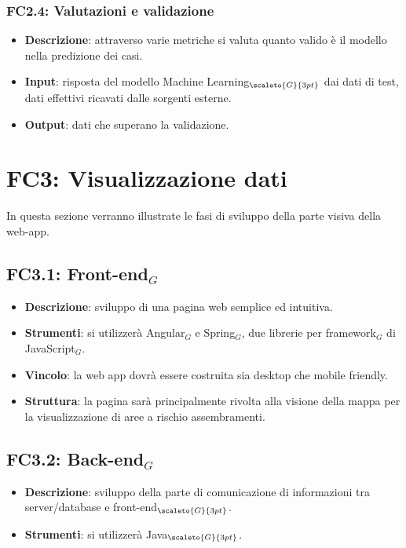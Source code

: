 \subsubsection{FC2.4: Valutazioni e validazione}\label{fasiProgettoElaborazioneDatiValutazioniValidazione}

\begin{itemize}
	\item \textbf{Descrizione}: attraverso varie metriche si valuta quanto valido è il modello nella predizione dei casi.
	\item \textbf{Input}: risposta del modello Machine Learning$_{\scaleto{G}{3pt}}$ dai dati di test, dati effettivi ricavati dalle sorgenti esterne.
	\item \textbf{Output}: dati che superano la validazione.
\end{itemize}

\section{FC3: Visualizzazione dati}\label{fasiProgettoVisualizzazioneDati}
In questa sezione verranno illustrate le fasi di sviluppo della parte visiva della web-app.

\subsection{FC3.1: Front-end$_G$}\label{fasiProgettoVisualizzazioneDatiFrontEnd}

\begin{itemize}
	\item \textbf{Descrizione}: sviluppo di una pagina web semplice ed intuitiva.
	\item \textbf{Strumenti}: si utilizzerà Angular$_G$ e Spring$_G$, due librerie per framework$_G$ di JavaScript$_G$.
	\item \textbf{Vincolo}: la web app dovrà essere costruita sia desktop che mobile friendly.
	\item \textbf{Struttura}: la pagina sarà principalmente rivolta alla visione della mappa per la visualizzazione di aree a rischio assembramenti.
\end{itemize}

\subsection{FC3.2: Back-end$_G$}\label{fasiProgettoVisualizzazioneDatiBackEnd}

\begin{itemize}
	\item \textbf{Descrizione}: sviluppo della parte di comunicazione di informazioni tra server/database e front-end$_{\scaleto{G}{3pt}}$.
	\item \textbf{Strumenti}: si utilizzerà Java$_{\scaleto{G}{3pt}}$.
\end{itemize}


